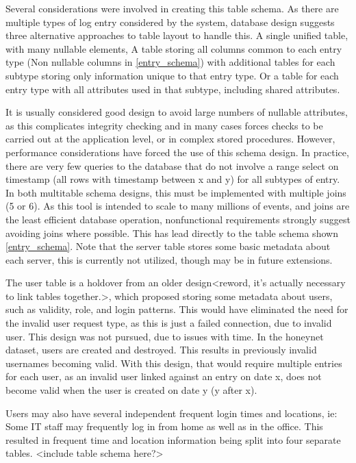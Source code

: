 Several considerations were involved in creating this table schema. As there are multiple types of log entry considered by the system, database design suggests three alternative approaches to table layout to handle this. A single unified table, with many nullable elements, A table storing all columns common to each entry type (Non nullable columns in \ref{entry_schema}) with additional tables for each subtype storing only information unique to that entry type. Or a table for each entry type with all attributes used in that subtype, including shared attributes.

It is usually considered good design to avoid large numbers of nullable attributes, as this complicates integrity checking and in many cases forces checks to be carried out at the application level, or in complex stored procedures. However, performance considerations have forced the use of this schema design. In practice, there are very few queries to the database that do not involve a range select on timestamp (all rows with timestamp between x and y) for all subtypes of entry. In both multitable schema designs, this must be implemented with multiple joins (5 or 6). As this tool is intended to scale to many millions of events, and joins are the least efficient database operation, nonfunctional requirements strongly suggest avoiding joins where possible. This has lead directly to the table schema shown \ref{entry_schema}. Note that the server table stores some basic metadata about each server, this is currently not utilized, though may be in future extensions.

The user table is a holdover from an older design<reword, it's actually necessary to link tables together.>, which proposed storing some metadata about users, such as validity, role, and login patterns. This would have eliminated the need for the invalid user request type, as this is just a failed connection, due to invalid user. This design was not pursued, due to issues with time. In the honeynet dataset, users are created and destroyed. This results in previously invalid usernames becoming valid. With this design, that would require multiple entries for each user, as an invalid user linked against an entry on date x, does not become valid when the user is created on date y (y after x).

Users may also have several independent frequent login times and locations, ie: Some IT staff may frequently log in from home as well as in the office. This resulted in frequent time and location information being split into four separate tables. <include table schema here?>

